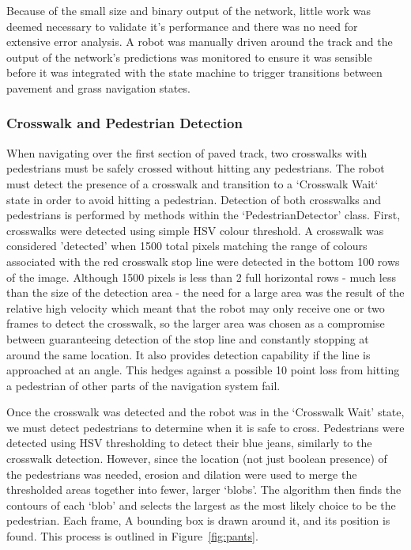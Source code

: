 \documentclass[titlepage, twocolumn]{article}
\begin{document}
            Because of the small size and binary output of the network, little work was deemed necessary to validate it's performance and there was no need for extensive error analysis. A robot was manually driven around the track and the output of the network's predictions was monitored to ensure it was sensible before it was integrated with the state machine to trigger transitions between pavement and grass navigation states.

        \subsubsection{Crosswalk and Pedestrian Detection}
            When navigating over the first section of paved track, two crosswalks with pedestrians must be safely crossed without hitting any pedestrians. The robot must detect the presence of a crosswalk and transition to a `Crosswalk Wait` state in order to avoid hitting a pedestrian. Detection of both crosswalks and pedestrians is performed by methods within the `PedestrianDetector' class. First, crosswalks were detected using simple HSV colour threshold. A crosswalk was considered 'detected' when 1500 total pixels matching the range of colours associated with the red crosswalk stop line were detected in the bottom 100 rows of the image. Although 1500 pixels is less than 2 full horizontal rows - much less than the size of the detection area - the need for a large area was the result of the relative high velocity which meant that the robot may only receive one or two frames to detect the crosswalk, so the larger area was chosen as a compromise between guaranteeing detection of the stop line and constantly stopping at around the same location. It also provides detection capability if the line is approached at an angle. This hedges against a possible 10 point loss from hitting a pedestrian of other parts of the navigation system fail.

            Once the crosswalk was detected and the robot was in the `Crosswalk Wait' state, we must detect pedestrians to determine when it is safe to cross. Pedestrians were detected using HSV thresholding to detect their blue jeans, similarly to the crosswalk detection. However, since the location (not just boolean presence) of the pedestrians was needed, erosion and dilation were used to merge the thresholded areas together into fewer, larger `blobs'. The algorithm then finds the contours of each `blob' and selects the largest as the most likely choice to be the pedestrian. Each frame, A bounding box is drawn around it, and its position is found. This process is outlined in Figure~\ref{fig:pants}.
\end{document}
